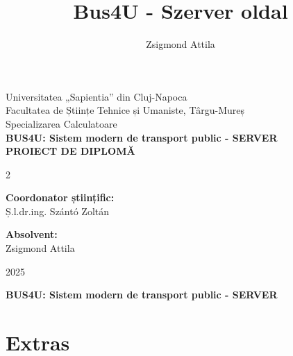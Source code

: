 \documentclass[a4paper, 12pt, twoside]{report}
\title{Bus4U - Szerver oldal}
\author{Zsigmond Attila}
\date{}
\begin{document}
\raggedbottom

\begin{titlepage}
  \centering
  \Large
  Universitatea „Sapientia” din Cluj-Napoca \\
  Facultatea de Științe Tehnice și Umaniste,
  Târgu-Mureș \\
  Specializarea Calculatoare \\
  \vspace{1.5in}
  \Huge
  \textbf{BUS4U: Sistem modern de transport public - SERVER} \\
  \vspace{0.5in}
  \Huge
  \textbf{PROIECT DE DIPLOMĂ} \\
  \vspace{1.5in}
  \Large
  \begin{multicols}{2}
    \begin{flushleft}
      \textbf{Coordonator științific:} \\
      Ș.l.dr.ing. Szántó Zoltán
    \end{flushleft}
    \columnbreak
    \begin{flushright}
      \textbf{Absolvent:} \\
      Zsigmond Attila
    \end{flushright}
  \end{multicols}
  \vspace{0.5in}
  \LARGE
  2025
\end{titlepage}



\begin{center}
  {\Large \textbf{BUS4U: Sistem modern de transport public - SERVER}}
\end{center}

\renewcommand{\abstractname}{Extras}
\section*{\abstractname}

\end{document}
